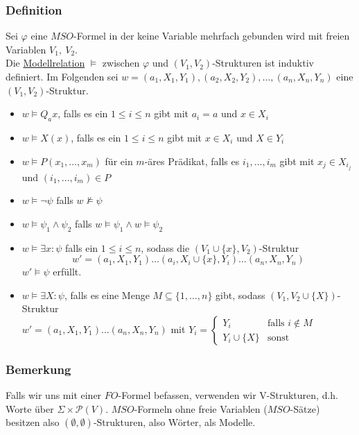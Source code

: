         \subsubsection{Definition}
            Sei $\varphi$ eine $MSO$-Formel in der keine Variable mehrfach gebunden wird mit freien Variablen $V_1,\ V_2$.\\
            Die \underline{Modellrelation} $\models$ zwischen $\varphi$ und $\left(V_1,V_2\right)$-Strukturen ist induktiv definiert. Im Folgenden sei $w=\left(a_1,X_1,Y_1\right),\left(a_2,X_2,Y_2\right),\dots,\left(a_n,X_n,Y_n\right)$ eine $\left(V_1,V_2\right)$-Struktur.
            \begin{itemize}
                \item $w\models Q_ax$, falls es ein $1\le i\le n$ gibt mit $a_i=a$ und $x\in X_i$
                \item $w\models X(x)$, falls es ein $1\le i\le n$ gibt mit $x\in X_i$ und $X\in Y_i$
                \item $w\models P(x_1,\dots,x_m)$ für ein $m$-äres Prädikat, falls es $i_1,\dots,i_m$ gibt mit $x_{j}\in X_{i_j}$ und $(i_1,\dots,i_m)\in P$
                \item $w\models\neg\psi$ falls $w\not\models\psi$
                \item $w\models\psi_1\wedge\psi_2$ falls $w\models\psi_1\wedge w\models\psi_2$
                \item $w\models\exists x:\psi$ falls ein $1\le i\le n$, sodass die $(V_1\cup \{x\},V_2)$-Struktur $$w'=(a_1,X_1,Y_1)\dots (a_i,X_i\cup\{x\},Y_i)\dots(a_n,X_n,Y_n)$$ $w'\models\psi$ erfüllt.
                \item $w\models\exists X:\psi$, falls es eine Menge $M\subseteq\{1,\dots,n\}$ gibt, sodass $(V_1,V_2\cup\{X\})$-Struktur\\$w'=(a_1,X_1,Y_1)\dots (a_n,X_n,Y_n)$ mit $Y_i=\begin{cases}
                    Y_i & \text{falls }i\not\in M\\
                    Y_i\cup\{X\} & \text{sonst}
                \end{cases}$
            \end{itemize}
        \subsubsection{Bemerkung}
            Falls wir uns mit einer $FO$-Formel befassen, verwenden wir V-Strukturen, d.h. Worte über $\Sigma\times\mathcal{P}(V)$. $MSO$-Formeln ohne freie Variablen ($MSO$-Sätze) besitzen also $(\emptyset,\emptyset)$-Strukturen, also Wörter, als Modelle.
